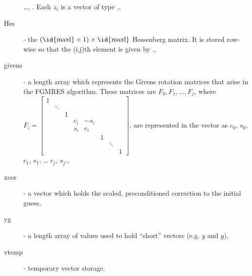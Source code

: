 \begin{description}
    \ldots, . Each $z_i$ is a vector of type {\nvector}.,
  \item[Hes] - the $(\text{\id{maxl}}+1)\times\text{\id{maxl}}$
    Hessenberg matrix. It is stored row-wise so that the (i,j)th
    element is given by .,
  \item[givens] - a length  array which represents the
    Givens rotation matrices that arise in the FGMRES algorithm. These
    matrices are $F_0, F_1, \ldots, F_j$, where
    $F_i = \begin{bmatrix}
      1 &        &   &     &      &   &        &   \\
        & \ddots &   &     &      &   &        &   \\
        &        & 1 &     &      &   &        &   \\
        &        &   & c_i & -s_i &   &        &   \\
        &        &   & s_i &  c_i &   &        &   \\
        &        &   &     &      & 1 &        &   \\
        &        &   &     &      &   & \ddots &   \\
        &        &   &     &      &   &        & 1\end{bmatrix}$,
    are represented in the  vector as 
    $c_0$,  $s_0$,  $c_1$,
     $s_1$, \ldots {} $c_j$,
     $s_j$.,
  \item[xcor] - a vector which holds the scaled, preconditioned
    correction to the initial guess,
  \item[yg] - a length  array of  values
    used to hold ``short'' vectors (e.g. $y$ and $g$),
  \item[vtemp] - temporary vector storage.
\end{description}

